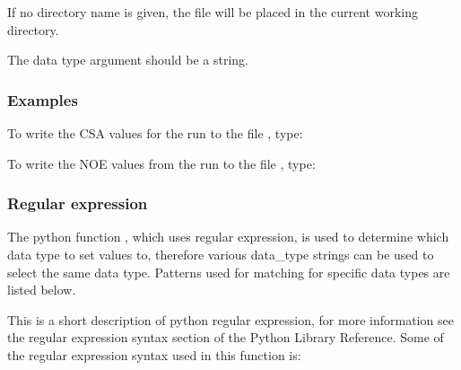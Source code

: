 If no directory name is given, the file will be placed in the current working directory.

The data type argument should be a string.


\subsubsection{Examples}

To write the CSA values for the run 
 to the file 
, type:





To write the NOE values from the run 
 to the file 
, type:









\subsubsection{Regular expression}

The python function 
, which uses regular expression, is used to determine which data
type to set values to, therefore various data\_type strings can be used to select the same
data type.  Patterns used for matching for specific data types are listed below.

This is a short description of python regular expression, for more information see the
regular expression syntax section of the Python Library Reference.  Some of the regular
expression syntax used in this function is:

